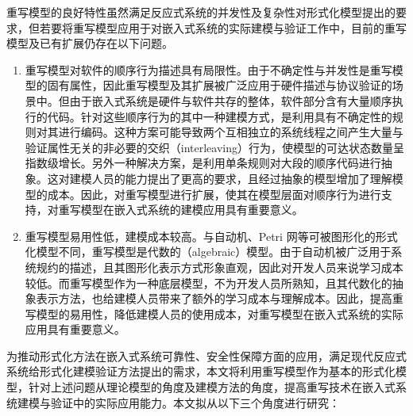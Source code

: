 重写模型的良好特性虽然满足反应式系统的并发性及复杂性对形式化模型提出的要求，但若要将重写模型应用于对嵌入式系统的实际建模与验证工作中，目前的重写模型及已有扩展仍存在以下问题。
\begin{enumerate}
\item
重写模型对软件的顺序行为描述具有局限性。由于不确定性与并发性是重写模型的固有属性，因此重写模型及其扩展被广泛应用于硬件描述与协议验证的场景中。但由于嵌入式系统是硬件与软件共存的整体，软件部分含有大量顺序执行的代码。针对这些顺序行为的其中一种建模方式，是利用具有不确定性的规则对其进行编码。这种方案可能导致两个互相独立的系统线程之间产生大量与验证属性无关的非必要的交织（interleaving）行为，使模型的可达状态数量呈指数级增长。另外一种解决方案，是利用单条规则对大段的顺序代码进行抽象。这对建模人员的能力提出了更高的要求，且经过抽象的模型增加了理解模型的成本。因此，对重写模型进行扩展，使其在模型层面对顺序行为进行支持，对重写模型在嵌入式系统的建模应用具有重要意义。
\item 
重写模型易用性低，建模成本较高。与自动机、Petri 网等可被图形化的形式化模型不同，重写模型是代数的（algebraic）模型。由于自动机被广泛用于系统规约的描述，且其图形化表示方式形象直观，因此对开发人员来说学习成本较低。而重写模型作为一种底层模型，不为开发人员所熟知，且其代数化的抽象表示方法，也给建模人员带来了额外的学习成本与理解成本。因此，提高重写模型的易用性，降低建模人员的使用成本，对重写模型在嵌入式系统的实际应用具有重要意义。
\end{enumerate}

为推动形式化方法在嵌入式系统可靠性、安全性保障方面的应用，满足现代反应式系统给形式化建模验证方法提出的需求，本文将利用重写模型作为基本的形式化模型，针对上述问题从理论模型的角度及建模方法的角度，提高重写技术在嵌入式系统建模与验证中的实际应用能力。本文拟从以下三个角度进行研究：

